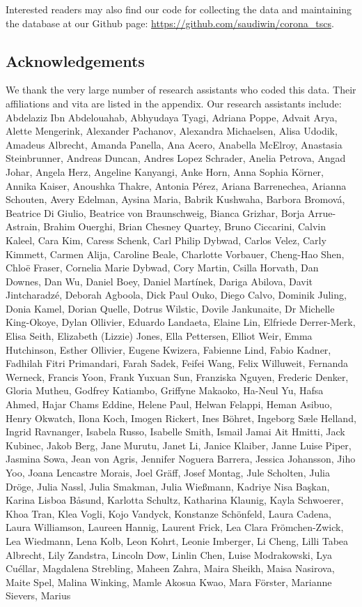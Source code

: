 \documentclass[
]{article}
\begin{document}
Interested readers may also find our code for collecting the data and maintaining the database at our Github page: \url{https://github.com/saudiwin/corona_tscs}.

\hypertarget{acknowledgements}{%
\subsection*{Acknowledgements}\label{acknowledgements}}

We thank the very large number of research assistants who coded this data. Their affiliations and vita are listed in the appendix. Our research assistants include:
Abdelaziz Ibn Abdelouahab, Abhyudaya Tyagi, Adriana Poppe, Advait Arya, Alette Mengerink, Alexander Pachanov, Alexandra Michaelsen, Alisa Udodik, Amadeus Albrecht, Amanda Panella, Ana Acero, Anabella McElroy, Anastasia Steinbrunner, Andreas Duncan, Andres Lopez Schrader, Anelia Petrova, Angad Johar, Angela Herz, Angeline Kanyangi, Anke Horn, Anna Sophia Körner, Annika Kaiser, Anoushka Thakre, Antonia Pérez, Ariana Barrenechea, Arianna Schouten, Avery Edelman, Aysina Maria, Babrik Kushwaha, Barbora Bromová, Beatrice Di Giulio, Beatrice von Braunschweig, Bianca Grizhar, Borja Arrue-Astrain, Brahim Ouerghi, Brian Chesney Quartey, Bruno Ciccarini, Calvin Kaleel, Cara Kim, Caress Schenk, Carl Philip Dybwad, Carlos Velez, Carly Kimmett, Carmen Alija, Caroline Beale, Charlotte Vorbauer, Cheng-Hao Shen, Chloë Fraser, Cornelia Marie Dybwad, Cory Martin, Csilla Horvath, Dan Downes, Dan Wu, Daniel Boey, Daniel Martínek, Dariga Abilova, Davit Jintcharadzé, Deborah Agboola, Dick Paul Ouko, Diego Calvo, Dominik Juling, Donia Kamel, Dorian Quelle, Dotrus Wilstic, Dovile Jankunaite, Dr Michelle King-Okoye, Dylan Ollivier, Eduardo Landaeta, Elaine Lin, Elfriede Derrer-Merk, Elisa Seith, Elizabeth (Lizzie) Jones, Ella Pettersen, Elliot Weir, Emma Hutchinson, Esther Ollivier, Eugene Kwizera, Fabienne Lind, Fabio Kadner, Fadhilah Fitri Primandari, Farah Sadek, Feifei Wang, Felix Willuweit, Fernanda Werneck, Francis Yoon, Frank Yuxuan Sun, Franziska Nguyen, Frederic Denker, Gloria Mutheu, Godfrey Katiambo, Griffyne Makaoko, Ha-Neul Yu, Hafsa Ahmed, Hajar Chams Eddine, Helene Paul, Helwan Felappi, Heman Asibuo, Henry Okwatch, Ilona Koch, Imogen Rickert, Ines Böhret, Ingeborg Sæle Helland, Ingrid Ravnanger, Isabela Russo, Isabelle Smith, Ismail Jamai Ait Hmitti, Jack Kubinec, Jakob Berg, Jane Murutu, Janet Li, Janice Klaiber, Janne Luise Piper, Jasmina Sowa, Jean von Agris, Jennifer Noguera Barrera, Jessica Johansson, Jiho Yoo, Joana Lencastre Morais, Joel Gräff, Josef Montag, Jule Scholten, Julia Dröge, Julia Nassl, Julia Smakman, Julia Wießmann, Kadriye Nisa Başkan, Karina Lisboa Båsund, Karlotta Schultz, Katharina Klaunig, Kayla Schwoerer, Khoa Tran, Klea Vogli, Kojo Vandyck, Konstanze Schönfeld, Laura Cadena, Laura Williamson, Laureen Hannig, Laurent Frick, Lea Clara Frömchen-Zwick, Lea Wiedmann, Lena Kolb, Leon Kohrt, Leonie Imberger, Li Cheng, Lilli Tabea Albrecht, Lily Zandstra, Lincoln Dow, Linlin Chen, Luise Modrakowski, Lya Cuéllar, Magdalena Strebling, Maheen Zahra, Maira Sheikh, Maisa Nasirova, Maite Spel, Malina Winking, Mamle Akosua Kwao, Mara Förster, Marianne Sievers, Marius 
\end{document}
